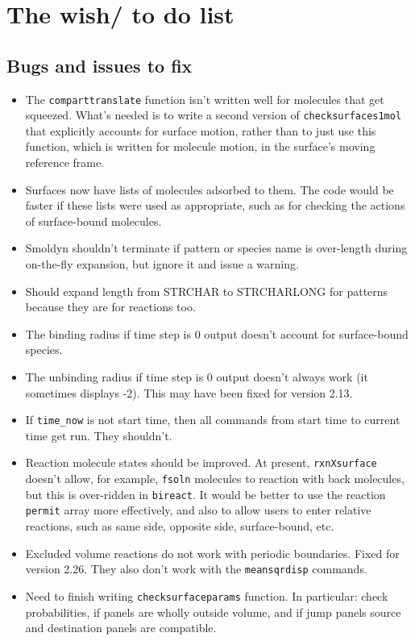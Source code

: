 \documentclass {scrbook}
\newcommand {\ttt} {\texttt}
\begin{document}
\chapter{The wish/ to do list}

\section{Bugs and issues to fix}
\begin{itemize}
\item The \ttt{comparttranslate} function isn't written well for molecules that get squeezed. What's needed is to write a second version of \ttt{checksurfaces1mol} that explicitly accounts for surface motion, rather than to just use this function, which is written for molecule motion, in the surface's moving reference frame.
\item Surfaces now have lists of molecules adsorbed to them. The code would be faster if these lists were used as appropriate, such as for checking the actions of surface-bound molecules.
\item Smoldyn shouldn't terminate if pattern or species name is over-length during on-the-fly expansion, but ignore it and issue a warning.
\item Should expand length from STRCHAR to STRCHARLONG for patterns because they are for reactions too.
\item The binding radius if time step is 0 output doesn't account for surface-bound species.
\item The unbinding radius if time step is 0 output doesn't always work (it sometimes displays -2). This may have been fixed for version 2.13.
\item If \ttt{time\_now} is not start time, then all commands from start time to current time get run. They shouldn't.
\item Reaction molecule states should be improved. At present, \ttt{rxnXsurface} doesn't allow, for example, \ttt{fsoln} molecules to reaction with back molecules, but this is over-ridden in \ttt{bireact}. It would be better to use the reaction \ttt{permit} array more effectively, and also to allow users to enter relative reactions, such as same side, opposite side, surface-bound, etc.
\item Excluded volume reactions do not work with periodic boundaries. Fixed for version 2.26. They also don't work with the \ttt{meansqrdisp} commands.
\item Need to finish writing \ttt{checksurfaceparams} function. In particular: check probabilities, if panels are wholly outside volume, and if jump panels source and destination panels are compatible.

\end{itemize}
\end{document}
